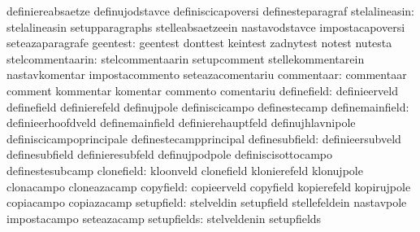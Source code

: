                                   definiereabsaetze                definujodstavce
                                  definiscicapoversi               definesteparagraf
                   stelalineasin: stelalineasin                    setupparagraphs
                                  stelleabsaetzeein                nastavodstavce
                                  impostacapoversi                 seteazaparagrafe
                        geentest: geentest                         donttest
                                  keintest                         zadnytest
                                  notest                           nutesta
                stelcommentaarin: stelcommentaarin                 setupcomment
                                  stellekommentarein               nastavkomentar
                                  impostacommento                  seteazacomentariu
                      commentaar: commentaar                       comment
                                  kommentar                        komentar
                                  commento                         comentariu
                     definefield: definieerveld                    definefield
                                  definierefeld                    definujpole
                                  definiscicampo                   definestecamp
                 definemainfield: definieerhoofdveld               definemainfield
                                  definierehauptfeld               definujhlavnipole
                                  definiscicampoprincipale         definestecampprincipal
                  definesubfield: definieersubveld                 definesubfield
                                  definieresubfeld                 definujpodpole
                                  definiscisottocampo              definestesubcamp
                      clonefield: kloonveld                        clonefield
                                  klonierefeld                     klonujpole
                                  clonacampo                       cloneazacamp
                       copyfield: copieerveld                      copyfield
                                  kopierefeld                      kopirujpole
                                  copiacampo                       copiazacamp
                      setupfield: stelveldin                       setupfield
                                  stellefeldein                    nastavpole
                                  impostacampo                     seteazacamp
                     setupfields: stelveldenin                     setupfields

